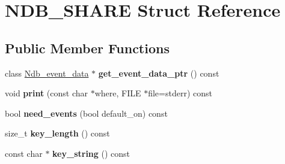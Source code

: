 \hypertarget{structNDB__SHARE}{}\section{N\+D\+B\+\_\+\+S\+H\+A\+RE Struct Reference}
\label{structNDB__SHARE}
\subsection*{Public Member Functions}
\begin{DoxyCompactItemize}
\item 
\mbox{\label{structNDB__SHARE_a6a3b3ce5abb932d558052645de7d3fc4}} 
class \mbox{\hyperlink{classNdb__event__data}{Ndb\+\_\+event\+\_\+data}} $\ast$ {\bfseries get\+\_\+event\+\_\+data\+\_\+ptr} () const
\item 
\mbox{\label{structNDB__SHARE_a9f49927e89452dc6e50457967b4f87cc}} 
void {\bfseries print} (const char $\ast$where, F\+I\+LE $\ast$file=stderr) const
\item 
\mbox{\label{structNDB__SHARE_a9e2dd9ef7acc9465d4f68702ed019d88}} 
bool {\bfseries need\+\_\+events} (bool default\+\_\+on) const
\item 
\mbox{\label{structNDB__SHARE_a00d0322fde057d69bcb19b935e60105d}} 
size\+\_\+t {\bfseries key\+\_\+length} () const
\item 
\mbox{\label{structNDB__SHARE_a780f54ebd7f82109a0d940a4fa748531}} 
const char $\ast$ {\bfseries key\+\_\+string} () const
\end{DoxyCompactItemize}
